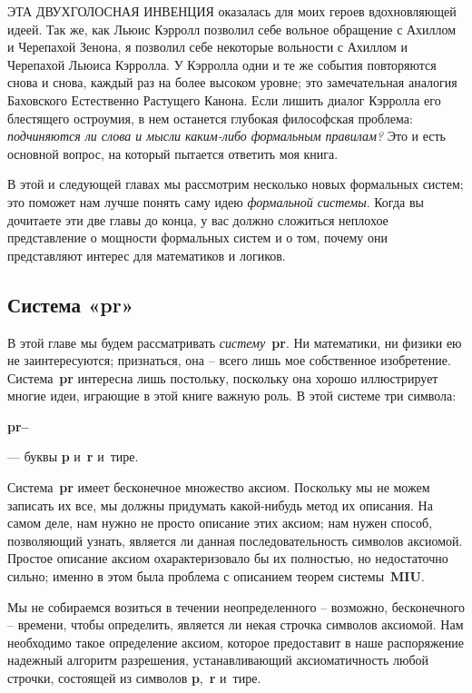\documentclass[../main.tex]{subfiles}
\begin{document}

ЭТА ДВУХГОЛОСНАЯ ИНВЕНЦИЯ оказалась для моих героев вдохновляющей идеей. Так же, как Льюис Кэрролл позволил себе вольное обращение с Ахиллом и Черепахой Зенона, я позволил себе некоторые вольности с Ахиллом и Черепахой Льюиса Кэрролла. У Кэрролла одни и те же события повторяются снова и снова, каждый раз на более высоком уровне; это замечательная аналогия Баховского Естественно Растущего Канона. Если лишить диалог Кэрролла его блестящего остроумия, в нем останется глубокая философская проблема: \emph{подчиняются ли слова и мысли каким-либо формальным правилам?} Это и есть основной вопрос, на который пытается ответить моя книга.

В этой и следующей главах мы рассмотрим несколько новых формальных систем; это поможет нам лучше понять саму идею \emph{формальной системы}. Когда вы дочитаете эти две главы до конца, у вас должно сложиться неплохое представление о мощности формальных систем и о том, почему они представляют интерес для математиков и логиков.


\subsection{Система «pr»}

В этой главе мы будем рассматривать \emph{систему}~\textbf{pr}. Ни математики, ни физики ею не заинтересуются; признаться, она \--- всего лишь мое собственное изобретение. Система~\textbf{pr} интересна лишь постольку, поскольку она хорошо иллюстрирует многие идеи, играющие в этой книге важную роль. В этой системе три символа:
\begin{center}
    \large%
    \textbf{p}\quad\textbf{r}\quad\textbf{--}
\end{center}

--- буквы \textbf{p} и~\textbf{r} и~тире.

Система~\textbf{pr} имеет бесконечное множество аксиом. Поскольку мы не можем записать их все, мы должны придумать какой-нибудь метод их описания. На самом деле, нам нужно не просто описание этих аксиом; нам нужен способ, позволяющий узнать, является ли данная последовательность символов аксиомой. Простое описание аксиом охарактеризовало бы их полностью, но недостаточно сильно; именно в этом была проблема с описанием теорем системы~\textbf{MIU}.

Мы не собираемся возиться в течении неопределенного \--- возможно, бесконечного \--- времени, чтобы определить, является ли некая строчка символов аксиомой. Нам необходимо такое определение аксиом, которое предоставит в наше распоряжение надежный алгоритм разрешения, устанавливающий аксиоматичность любой строчки, состоящей из символов \textbf{p},~\textbf{r} и~тире.
\end{document}

